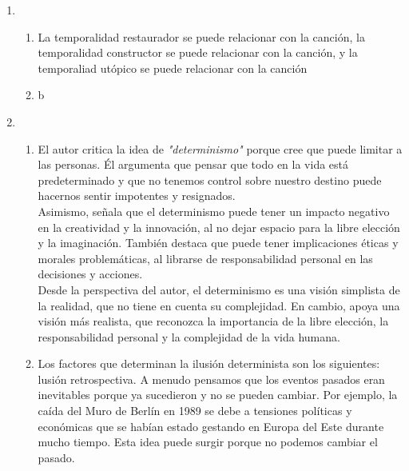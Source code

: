 \documentclass[10pt, a4paper]{article}
\begin{document}
    \begin{enumerate}

      \item \begin{enumerate}
        \item La temporalidad restaurador se puede relacionar con la canción, la
          temporalidad constructor se puede relacionar con la canción, y la
          temporaliad utópico se puede relacionar con la canción
        \item b
      \end{enumerate} 

      \item \begin{enumerate}

        \item El autor critica la idea de \textit{"determinismo"} porque cree que 
          puede limitar a las personas. Él argumenta que pensar que todo en la 
          vida está predeterminado y que no tenemos control sobre nuestro destino 
          puede hacernos sentir impotentes y resignados. \\

          Asimismo, señala que el determinismo puede tener un impacto negativo en 
          la creatividad y la innovación, al no dejar espacio para la libre elección 
          y la imaginación. También destaca que puede tener implicaciones éticas 
          y morales problemáticas, al librarse de responsabilidad personal en 
          las decisiones y acciones.\\

          Desde la perspectiva del autor, el determinismo es una visión simplista 
          de la realidad, que no tiene en cuenta su complejidad. En cambio, apoya 
          una visión más realista, que reconozca la importancia de la libre elección, 
          la responsabilidad personal y la complejidad de la vida humana.

        \item Los factores que determinan la ilusión determinista son los siguientes:\\ 
          lusión retrospectiva. A menudo pensamos que los eventos pasados eran 
          inevitables porque ya sucedieron y no se pueden cambiar. Por ejemplo, 
          la caída del Muro de Berlín en 1989 se debe a tensiones políticas y 
          económicas que se habían estado gestando en Europa del Este durante 
          mucho tiempo. Esta idea puede surgir porque no podemos cambiar el 
          pasado.\\


\end{enumerate}
\end{enumerate}
\end{document}

